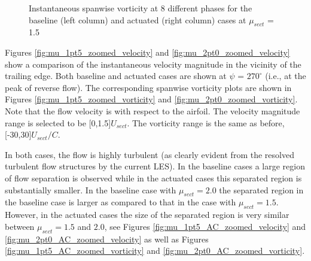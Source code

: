 \begin{figure}[H]
	
	
	\caption{Instantaneous spanwise vorticity at 8 different phases for the baseline (left column) and actuated (right column) cases at $\mu_{sect}$ = 1.5}
	\label{fig:vortScreen_mu1pt5}
\end{figure}

Figures \ref{fig:mu_1pt5_zoomed_velocity} and \ref{fig:mu_2pt0_zoomed_velocity} show a comparison of the instantaneous velocity magnitude in the vicinity of the trailing edge. Both baseline and actuated cases are shown at $\psi$ = $270^\circ$ (i.e., at the peak of reverse flow).
The corresponding spanwise vorticity plots are shown in Figures \ref{fig:mu_1pt5_zoomed_vorticity} and \ref{fig:mu_2pt0_zoomed_vorticity}.
Note that the flow velocity is with respect to the airfoil. 
The velocity magnitude range is selected to be [0,1.5]$ U_{sect}$.
The vorticity range is the same as before, [-30,30]$ U_{sect}/C$.

In both cases, the flow is highly turbulent (as clearly evident from the resolved turbulent flow structures by the current LES). 
In the baseline cases a large region of flow separation is observed while in the actuated cases this separated region is substantially smaller.
In the baseline case with $\mu_{sect}=2.0$ the separated region in the baseline case is larger as compared to that in the case with $\mu_{sect}=1.5$.
However, in the actuated cases the size of the separated region is very similar  between $\mu_{sect}=1.5$ and $2.0$, see Figures \ref{fig:mu_1pt5_AC_zoomed_velocity} and \ref{fig:mu_2pt0_AC_zoomed_velocity} as well as Figures \ref{fig:mu_1pt5_AC_zoomed_vorticity} and \ref{fig:mu_2pt0_AC_zoomed_vorticity}.

